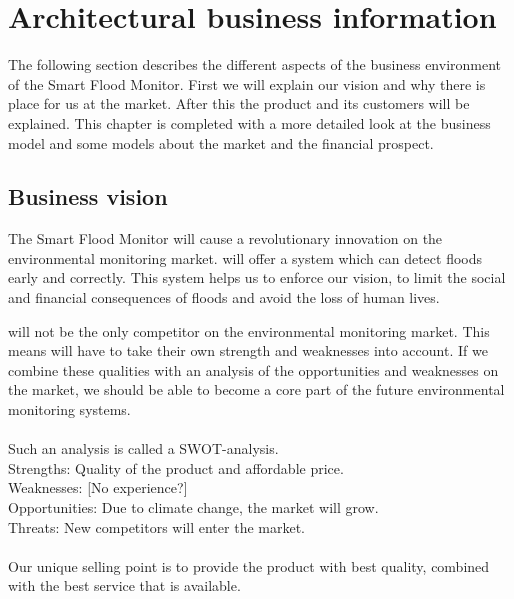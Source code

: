 \chapter{Architectural business information}
\label{ch:business}
The following section describes the different aspects of the business environment of the Smart Flood Monitor. First we will explain our vision and why there is place for us at the market. After this the product and its customers will be explained. This chapter is completed with a more detailed look at the business model and some models about the market and the financial prospect.

\section{Business vision}
The Smart Flood Monitor will cause a revolutionary innovation on the environmental monitoring market. \CompanyName will offer a system which can detect floods early and correctly. This system helps us to enforce our vision, to limit the social and financial consequences of floods and avoid the loss of human lives. 

\CompanyName will not be the only competitor on the environmental monitoring market. This means \CompanyName will have to take their own strength and weaknesses into account. If we combine these qualities with an analysis of the opportunities and weaknesses on the market, we should be able to become a core part of the future environmental monitoring systems.\\\\

Such an analysis is called a SWOT-analysis. 
\\
Strengths: Quality of the product and affordable price.\\ %
Weaknesses: [No experience?]\\
Opportunities: Due to climate change, the market will grow. \\
Threats: New competitors will enter the market.\\\\

Our unique selling point is to provide the product with best quality, combined with the best service that is available.

